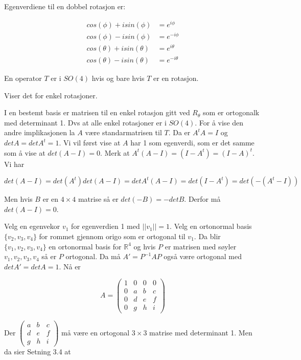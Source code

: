 \documentclass[a4paper,10pt,english]{article}
\begin{document}
    Egenverdiene til en dobbel rotasjon er:
    
    \begin{align*}
        cos(\phi)+isin(\phi) &= e^{i\phi} \nonumber \\
        cos(\phi)-isin(\phi) &= e^{-i\phi} \nonumber \\
        cos(\theta)+isin(\theta) &= e^{i\theta} \nonumber \\
        cos(\theta)-isin(\theta) &= e^{-i\theta} \nonumber
    \end{align*}

    En operator $T$ er i $SO(4)$ hvis og bare hvis $T$ er en rotasjon.

    Viser det for enkel rotasjoner.

    I en bestemt basis er matrisen til en enkel rotasjon gitt ved $R_{\theta}$ som er ortogonalk med determinant 1. Dvs at alle enkel rotasjoner er i $SO(4)$.
    For å vise den andre implikasjonen la $A$ være standarmatrisen til $T$. Da er $A^{t}A = I$ og $det A = det A^{t} = 1$. Vi vil først vise at $A$ har 1 som egenverdi, som er det samme som å vise 
    at $det(A - I) = 0$. Merk at $A^{t}(A - I) = (I - A^{t}) = (I - A)^{t}$. Vi har 

    $$ det(A- I) = det(A^{t})det(A - I) = det A^{t}(A - I) = det(I- A^{t}) = det(-(A^{t} - I)) $$

    Men hvis $B$ er en $4 \times 4$ matrise så er $det(-B) = -det B$. Derfor må $det(A - I) = 0$.
    
    Velg en egenvekor $v_{1}$ for egenverdien 1 med $||v_{1}|| = 1$. Velg en ortonormal basis $\{v_{2}, v_{3}, v_{4}\}$ for rommet gjennom origo som er ortogonal til $v_{1}$.
    Da blir $\{v_{1}, v_{2}, v_{3}, v_{4}\}$ en ortonormal basis for $\mathbb{R}^{4}$ og hvis $P$ er matrisen med søyler $v_{1}, v_{2}, v_{3}, v_{4}$ så er $P$ ortogonal.
    Da må $A' = P^{-1}AP$ også være ortogonal med $det A' = det A = 1$.
    Nå er 

    $$
    A = \left(
    \begin{matrix}
        1 & 0 & 0 & 0 \\
        0 & a & b & c \\
        0 & d & e & f \\
        0 & g & h & i
    \end{matrix}
    \right)
    $$

Der $\left( \begin{matrix} a & b & c \\ d & e & f \\ g & h & i \end{matrix} \right)$ må være en ortogonal $3 \times 3$ matrise med determinant 1. Men da sier Setning 3.4 \cite{kompendium} at
\end{document}
